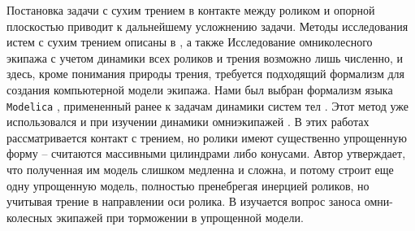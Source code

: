 Постановка задачи с сухим трением в контакте между роликом и опорной плоскостью приводит к дальнейшему усложнению задачи. Методы исследования истем с сухим трением описаны в \cite{PfeifferGlocker1993,Pfeiffer1996,Anitescu1997,Lacoursiere2011,Charles2014,Paoli2015,Moreau1988}, а также \cite{Novozhilov1991} Исследование омниколесного экипажа с учетом динамики всех роликов и трения возможно лишь численно, и здесь, кроме понимания природы трения, требуется подходящий формализм для создания компьютерной модели экипажа. Нами был выбран формализм языка \texttt{Modelica} \cite{ModelicaSpec,Dymola,Fritzson}, примененный ранее к задачам динамики систем тел \cite{KosenkoQuaternionRus,Kosenko2006unilat,Kosenko2006,Kosenko2007,KosenkoGraphs2009,KosenkoGusev2012,KosenkoRolling,Kosenko2006,KosenkoAlexandrov,KosenkoKuznetzova}. Этот метод уже использовался и при изучении динамики омниэкипажей \cite{Kalman2012assistant,Kalman2013control,Kalman2013braking,Kalman2013practical}. В этих работах рассматривается контакт с трением, но ролики имеют существенно упрощенную форму -- считаются массивными цилиндрами либо конусами. Автор утверждает, что полученная им модель слишком медленна и сложна, и потому строит еще одну упрощенную модель, полностью пренебрегая инерцией роликов, но учитывая  трение в направлении оси ролика. В \cite{Kalman2013braking} изучается вопрос заноса омни-колесных экипажей при торможении в упрощенной модели.


